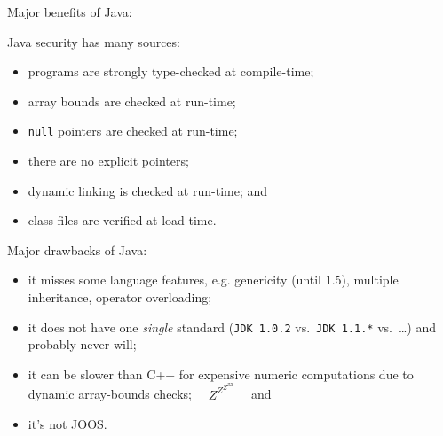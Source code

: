 \def\C++{\leavevmode\rm{\hbox{C\hskip -0.1ex\raise 0.25ex\hbox{\small ++}}}}
\begin{slide*}
Major benefits of Java:
\vfil
\end{slide*}

\begin{slide*}
Java security has many sources:
\begin{itemize}
\item programs are strongly type-checked at compile-time;
\item array bounds are checked at run-time;
\item {\tt null} pointers are checked at run-time;
\item there are no explicit pointers;
\item dynamic linking is checked at run-time; and
\item class files are verified at load-time.
\end{itemize}
\vfil
\end{slide*}

\begin{slide*}
Major drawbacks of Java:
\begin{itemize}
\item it misses some language features, e.g. genericity (until 1.5),
  multiple inheritance, operator overloading;
\item it does not have one {\em single} standard ({\tt JDK 1.0.2} vs.\ {\tt JDK
    1.1.*} vs.\ \ldots) and probably never will; 
\item it can be slower than C++ for expensive numeric computations due to
dynamic array-bounds checks;~~ $Z^{\displaystyle Z^{\displaystyle
Z^{\displaystyle ZZ}}}$~~ and
\item it's not JOOS.
\end{itemize}
\vfil
\end{slide*}

